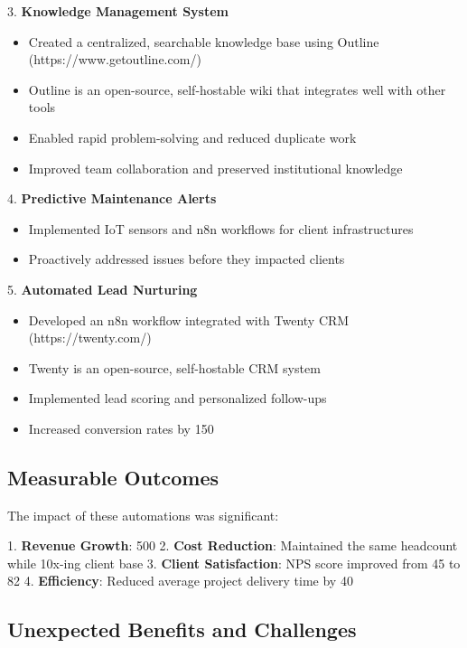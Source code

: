 {3. \textbf{Knowledge Management System}
\begin{itemize}
    \item Created a centralized, searchable knowledge base using Outline (https://www.getoutline.com/)
    \item Outline is an open-source, self-hostable wiki that integrates well with other tools
    \item Enabled rapid problem-solving and reduced duplicate work
    \item Improved team collaboration and preserved institutional knowledge
\end{itemize}

4. \textbf{Predictive Maintenance Alerts}
\begin{itemize}
    \item Implemented IoT sensors and n8n workflows for client infrastructures
    \item Proactively addressed issues before they impacted clients
\end{itemize}

5. \textbf{Automated Lead Nurturing}
\begin{itemize}
    \item Developed an n8n workflow integrated with Twenty CRM (https://twenty.com/)
    \item Twenty is an open-source, self-hostable CRM system
    \item Implemented lead scoring and personalized follow-ups
    \item Increased conversion rates by 150%
\end{itemize}

\subsection{Measurable Outcomes}

The impact of these automations was significant:

1. \textbf{Revenue Growth}: 500%
2. \textbf{Cost Reduction}: Maintained the same headcount while 10x-ing client base
3. \textbf{Client Satisfaction}: NPS score improved from 45 to 82
4. \textbf{Efficiency}: Reduced average project delivery time by 40%

\subsection{Unexpected Benefits and Challenges}

}
